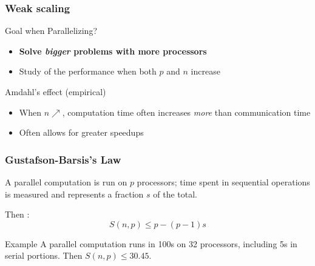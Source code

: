 \documentclass[xcolor={x11names,svgnames,psnames}]{beamer}
\begin{document}
\begin{frame}
\frametitle{Weak scaling}

\begin{alertblock}{Goal when Parallelizing?}
  \begin{itemize}
  \item \textbf{Solve \emph{bigger} problems with more processors}
  \item[$\Rightarrow$] Study of the performance when both $p$ and $n$ increase
  \end{itemize}
\end{alertblock}

\medskip

\begin{exampleblock}{Amdahl's effect (empirical)}
\begin{itemize}
\item When $n \nearrow$, computation time often increases \emph{more} than communication time
\item Often allows for greater speedups
\end{itemize}
\end{exampleblock}
\end{frame}


\begin{frame}
  \frametitle{Gustafson-Barsis's Law}
  
  A parallel computation is run on $p$ processors; time spent in sequential operations is measured and represents a fraction $s$ of the total.

  \medskip
  
  Then :
  \[
    S(n, p) \leq  p - (p-1)s
  \]

    \medskip
  
    \begin{block}{Example}
      A parallel computation runs in 100s on 32 processors, including 5s in serial portions.
      Then $S(n, p) \leq 30.45$.
    \end{block}
  \end{frame}


\end{document}
